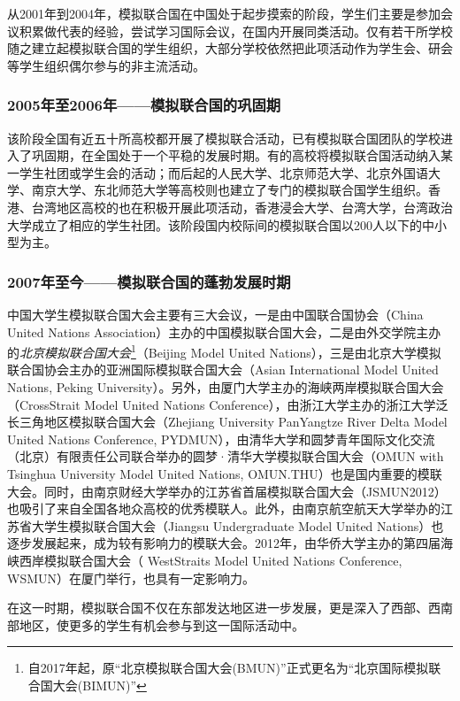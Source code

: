 \documentclass[a4paper,openany]{book}
\begin{document}
从2001年到2004年，模拟联合国在中国处于起步摸索的阶段，学生们主要是参加会议积累做代表的经验，尝试学习国际会议，在国内开展同类活动。仅有若干所学校随之建立起模拟联合国的学生组织，大部分学校依然把此项活动作为学生会、研会等学生组织偶尔参与的非主流活动。

\subsubsection{2005年至2006年——模拟联合国的巩固期}

该阶段全国有近五十所高校都开展了模拟联合活动，已有模拟联合国团队的学校进入了巩固期，在全国处于一个平稳的发展时期。有的高校将模拟联合国活动纳入某一学生社团或学生会的活动；而后起的人民大学、北京师范大学、北京外国语大学、南京大学、东北师范大学等高校则也建立了专门的模拟联合国学生组织。香港、台湾地区高校的也在积极开展此项活动，香港浸会大学、台湾大学，台湾政治大学成立了相应的学生社团。该阶段国内校际间的模拟联合国以200人以下的中小型为主。

\subsubsection{2007年至今——模拟联合国的蓬勃发展时期}

中国大学生模拟联合国大会主要有三大会议，一是由中国联合国协会（China United Nations Association）主办的中国模拟联合国大会，二是由外交学院主办的\textit{北京模拟联合国大会}\footnote{自2017年起，原“北京模拟联合国大会(BMUN)”正式更名为“北京国际模拟联合国大会(BIMUN)”}（Beijing Model United Nations），三是由北京大学模拟联合国协会主办的亚洲国际模拟联合国大会（Asian International Model United Nations, Peking University）。另外，由厦门大学主办的海峡两岸模拟联合国大会（CrossStrait Model United Nations Conference），由浙江大学主办的浙江大学泛长三角地区模拟联合国大会（Zhejiang University PanYangtze River Delta Model United Nations Conference, PYDMUN），由清华大学和圆梦青年国际文化交流（北京）有限责任公司联合举办的圆梦·清华大学模拟联合国大会（OMUN with Tsinghua University Model United Nations, OMUN.THU）也是国内重要的模联大会。同时，由南京财经大学举办的江苏省首届模拟联合国大会（JSMUN2012）也吸引了来自全国各地众高校的优秀模联人。此外，由南京航空航天大学举办的江苏省大学生模拟联合国大会（Jiangsu Undergraduate Model United Nations）也逐步发展起来，成为较有影响力的模联大会。2012年，由华侨大学主办的第四届海峡西岸模拟联合国大会（ WestStraits Model United Nations Conference, WSMUN）在厦门举行，也具有一定影响力。

在这一时期，模拟联合国不仅在东部发达地区进一步发展，更是深入了西部、西南部地区，使更多的学生有机会参与到这一国际活动中。
\end{document}
